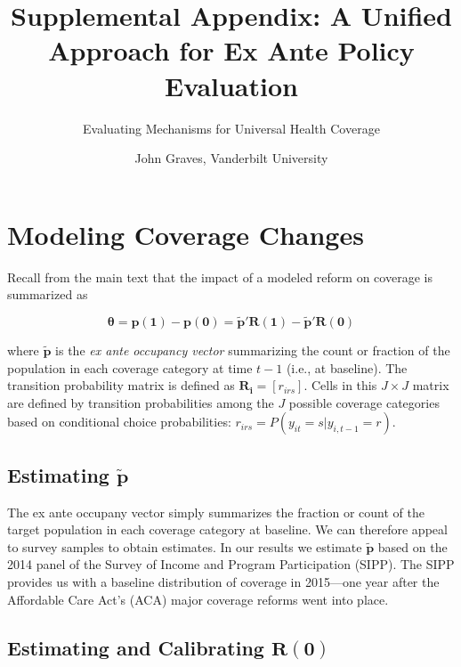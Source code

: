 \documentclass[
  10pt,
]{article}
\title{Supplemental Appendix: A Unified Approach for Ex Ante Policy Evaluation}
\subtitle{Evaluating Mechanisms for Universal Health Coverage}
\author{John Graves, Vanderbilt University}
\date{}
\begin{document}
\maketitle

\centering
\raggedright

\hypertarget{modeling-coverage-changes}{%
\section{Modeling Coverage Changes}\label{modeling-coverage-changes}}

Recall from the main text that the impact of a modeled reform on
coverage is summarized as

\begin{equation}
\label{eq:takeup_potout}
  \boldsymbol{\theta} = \boldsymbol{p(1)} -  \boldsymbol{p(0)} 
  = \boldsymbol{\tilde{p}'R(1)} - \boldsymbol{\tilde{p}'R(0)}
\end{equation}

\noindent where \(\boldsymbol{\tilde p}\) is the \emph{ex ante occupancy
vector} summarizing the count or fraction of the population in each
coverage category at time \(t-1\) (i.e., at baseline). The transition
probability matrix is defined as \(\boldsymbol{R_i} = [r_{irs}]\). Cells
in this \(J \times J\) matrix are defined by transition probabilities
among the \(J\) possible coverage categories based on conditional choice
probabilities: \(r_{irs} = P(y_{it} = s | y_{i,t-1}=r)\).

\hypertarget{estimating-boldsymboltilde-p}{%
\subsection{\texorpdfstring{Estimating
\(\boldsymbol{\tilde p}\)}{Estimating \textbackslash boldsymbol\{\textbackslash tilde p\}}}\label{estimating-boldsymboltilde-p}}

The ex ante occupany vector simply summarizes the fraction or count of
the target population in each coverage category at baseline. We can
therefore appeal to survey samples to obtain estimates. In our results
we estimate \(\boldsymbol{\tilde p}\) based on the 2014 panel of the
Survey of Income and Program Participation (SIPP). The SIPP provides us
with a baseline distribution of coverage in 2015---one year after the
Affordable Care Act's (ACA) major coverage reforms went into place.

\hypertarget{estimating-and-calibrating-boldsymbolr0}{%
\subsection{\texorpdfstring{Estimating and Calibrating
\(\boldsymbol{R(0)}\)}{Estimating and Calibrating \textbackslash boldsymbol\{R(0)\}}}\label{estimating-and-calibrating-boldsymbolr0}}
\end{document}
